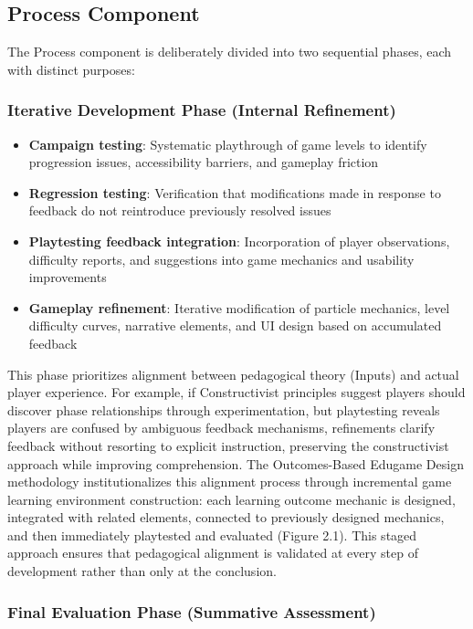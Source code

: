 \subsection{Process Component}

The Process component is deliberately divided into two sequential phases, each with distinct purposes:

\subsubsection{Iterative Development Phase (Internal Refinement)}

\begin{itemize}
    \item \textbf{Campaign testing}: Systematic playthrough of game levels to identify progression issues, accessibility barriers, and gameplay friction
    \item \textbf{Regression testing}: Verification that modifications made in response to feedback do not reintroduce previously resolved issues
    \item \textbf{Playtesting feedback integration}: Incorporation of player observations, difficulty reports, and suggestions into game mechanics and usability improvements
    \item \textbf{Gameplay refinement}: Iterative modification of particle mechanics, level difficulty curves, narrative elements, and UI design based on accumulated feedback
\end{itemize}

This phase prioritizes alignment between pedagogical theory (Inputs) and actual player experience. For example, if Constructivist principles suggest players should discover phase relationships through experimentation, but playtesting reveals players are confused by ambiguous feedback mechanisms, refinements clarify feedback without resorting to explicit instruction, preserving the constructivist approach while improving comprehension. The Outcomes-Based Edugame Design methodology \cite{Sison2018} institutionalizes this alignment process through incremental game learning environment construction: each learning outcome mechanic is designed, integrated with related elements, connected to previously designed mechanics, and then immediately playtested and evaluated (Figure 2.1). This staged approach ensures that pedagogical alignment is validated at every step of development rather than only at the conclusion.

\subsubsection{Final Evaluation Phase (Summative Assessment)}

